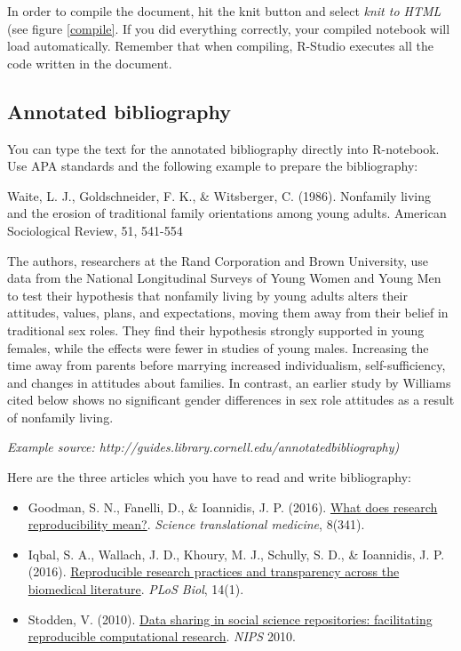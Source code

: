 \documentclass{article}\usepackage[]{graphicx}\usepackage[]{color}
\begin{document}
In order to compile the document, hit the knit button and select \emph{knit to HTML} (see figure \ref{compile}. If you did everything correctly, your compiled notebook will load automatically. Remember that when compiling, R-Studio executes all the code written in the document.

\subsection*{Annotated bibliography}

You can type the text for the annotated bibliography directly into R-notebook. Use APA standards and the following example to prepare the bibliography:

Waite, L. J., Goldschneider, F. K., & Witsberger, C. (1986). Nonfamily living and the erosion of traditional family orientations among young adults. American Sociological Review, 51, 541-554

The authors, researchers at the Rand Corporation and Brown University, use data from the National Longitudinal Surveys of Young Women and Young Men to test their hypothesis that nonfamily living by young adults alters their attitudes, values, plans, and expectations, moving them away from their belief in traditional sex roles. They find their hypothesis strongly supported in young females, while the effects were fewer in studies of young males. Increasing the time away from parents before marrying increased individualism, self-sufficiency, and changes in attitudes about families. In contrast, an earlier study by Williams cited below shows no significant gender differences in sex role attitudes as a result of nonfamily living.

\emph{Example source: http://guides.library.cornell.edu/annotatedbibliography)}

Here are the three articles which you have to read and write bibliography:

\begin{itemize}
\item Goodman, S. N., Fanelli, D., & Ioannidis, J. P. (2016). \href{https://www.dropbox.com/s/4io57pvabqw539s/Goodman%2C%202016.pdf?dl=0)}{What does research reproducibility mean?}. \emph{Science translational medicine}, 8(341).
\item  Iqbal, S. A., Wallach, J. D., Khoury, M. J., Schully, S. D., & Ioannidis, J. P. (2016). \href{https://www.dropbox.com/s/dgl3tbskfjjn5ib/iqbal_et_al%2C%202016.PDF?dl=0}{Reproducible research practices and transparency across the biomedical literature}. \emph{PLoS Biol}, 14(1).
\item  Stodden, V. (2010). \href{https://www.dropbox.com/s/uh7vd6diud8tcyu/Stodden%2C%202010.pdf?dl=0}{Data sharing in social science repositories: facilitating reproducible computational research}. \emph{NIPS} 2010.
\end{itemize}
\end{document}
